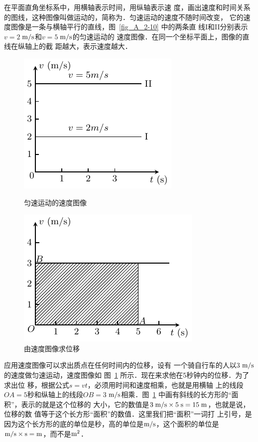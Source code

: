 在平面直角坐标系中，用横轴表示时间，用纵轴表示速
度，画出速度和时间关系的图线，这种图像叫做运动的，简称为．匀速运动的速度不随时间改变，
它的速度图像是一条与横轴平行的直线，图~\ref{fig_A_2-10} 中的两条直
线I和II分别表示$v=2$$\;\text{m}/\text{s}$和$v=5$$\;\text{m}/\text{s}$的匀速运动的
速度图像．在同一个坐标平面上，图像的直线在纵轴上的截
距越大，表示速度越大．
\begin{figure}[htp]
    \centering
    \begin{minipage}[t]{0.48\textwidth}
        \centering
        \includegraphics{fig/A/2-10.pdf}
        \caption{匀速运动的速度图像}\label{fig_A_2-10}
    \end{minipage}
    \begin{minipage}[t]{0.48\textwidth}
        \centering
        \includegraphics{fig/A/2-11.pdf}
        \caption{由速度图像求位移}\label{fig_A_2-11}
    \end{minipage}
\end{figure}

应用速度图像可以求出质点在任何时间内的位移，设有
一个骑自行车的人以3$\;\text{m}/\text{s}$的速度做匀速运动，速度图像如
图~\ref{fig_A_2-11} 所示．现在来求他在5秒钟内的位移．为了求出位
移，根据公式$s=vt$，必须用时间和速度相乘，也就是用横轴
上的线段$OA=5$秒和纵轴上的线段$OB=3$$\;\text{m}/\text{s}$相乘．图~\ref{fig_A_2-11} 
中画有斜线的长方形的“面积”，表示的就是这个位移的
大小，它的数值是$3 \;\text{m}/\text{s} \times 5 \;\text{s} = 15 \;\text{m}$，也就是说，位移的数
值等于这个长方形“面积”的数值．这里我们把“面积”一词打
上引号，是因为这个长方形的底的单位是秒，高的单位是$\text{m}/\text{s}$，这个面积的单位是$\text{m}/\text{s} \times \text{s}= \text{m} $，而不是$ \text{m}^2 $．

